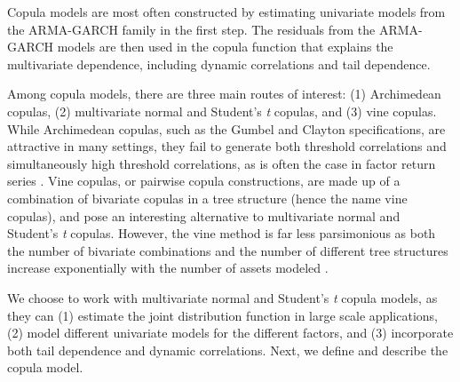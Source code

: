 Copula models are most often constructed by estimating univariate models from the ARMA-GARCH family in the first step. The residuals from the ARMA-GARCH models are then used in the copula function that explains the multivariate dependence, including dynamic correlations and tail dependence.

Among copula models, there are three main routes of interest: (1) Archimedean copulas, (2) multivariate normal and Student's \textit{t} copulas, and (3) vine copulas. While Archimedean copulas, such as the Gumbel and Clayton specifications, are attractive in many settings, they fail to generate both threshold correlations and simultaneously high threshold correlations, as is often the case in factor return series \textcite{ChristoffersenLanglois2013}. Vine copulas, or pairwise copula constructions, are made up of a combination of bivariate copulas in a tree structure (hence the name vine copulas), and pose an interesting alternative to multivariate normal and Student's \textit{t} copulas. However, the vine method is far less parsimonious as both the number of bivariate combinations and the number of different tree structures increase exponentially with the number of assets modeled \autocite{Aas2009}.

We choose to work with multivariate normal and Student's \textit{t} copula models, as they can (1) estimate the joint distribution function in large scale applications, (2) model different univariate models for the different factors, and (3) incorporate both tail dependence and dynamic correlations. Next, we define and describe the copula model.